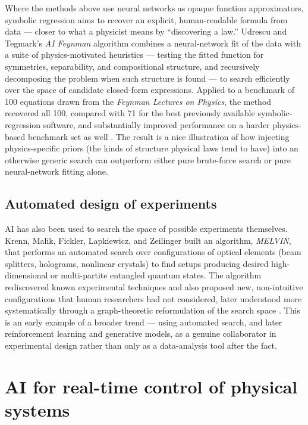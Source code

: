 \documentclass[11pt]{article}
\begin{document}
Where the methods above use neural networks as opaque function approximators, symbolic regression aims to recover an explicit, human-readable formula from data --- closer to what a physicist means by ``discovering a law.'' Udrescu and Tegmark's \emph{AI Feynman} algorithm combines a neural-network fit of the data with a suite of physics-motivated heuristics --- testing the fitted function for symmetries, separability, and compositional structure, and recursively decomposing the problem when such structure is found --- to search efficiently over the space of candidate closed-form expressions. Applied to a benchmark of 100 equations drawn from the \emph{Feynman Lectures on Physics}, the method recovered all 100, compared with 71 for the best previously available symbolic-regression software, and substantially improved performance on a harder physics-based benchmark set as well \cite{udrescu2020}. The result is a nice illustration of how injecting physics-specific priors (the kinds of structure physical laws tend to have) into an otherwise generic search can outperform either pure brute-force search or pure neural-network fitting alone.

\subsection{Automated design of experiments}

AI has also been used to search the space of possible experiments themselves. Krenn, Malik, Fickler, Lapkiewicz, and Zeilinger built an algorithm, \emph{MELVIN}, that performs an automated search over configurations of optical elements (beam splitters, holograms, nonlinear crystals) to find setups producing desired high-dimensional or multi-partite entangled quantum states. The algorithm rediscovered known experimental techniques and also proposed new, non-intuitive configurations that human researchers had not considered, later understood more systematically through a graph-theoretic reformulation of the search space \cite{krenn2016}. This is an early example of a broader trend --- using automated search, and later reinforcement learning and generative models, as a genuine collaborator in experimental design rather than only as a data-analysis tool after the fact.

\section{AI for real-time control of physical systems}
\label{sec:control}
\end{document}
